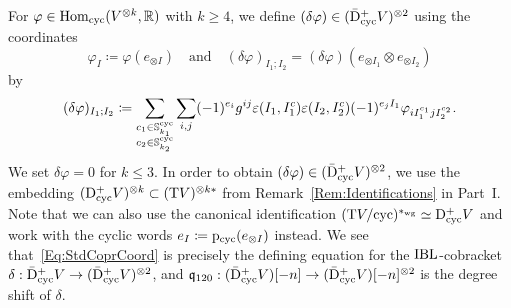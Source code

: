 \documentclass[\MainFolder/Text.tex]{subfiles}
\begin{document}
For $\varphi\in \mathrm{Hom}_{\mathrm{cyc}}(V^{\otimes k},\mathbb{R})$ with $k\ge 4$, we define $(\delta\varphi)\in(\bar{\mathrm{D}}^+_{\mathrm{cyc}} V)^{\otimes 2}$ using the coordinates
\begin{equation}\label{Eq:CoefCoord}
\varphi_{I} \coloneqq \varphi(e_{\otimes I})\quad\text{and}\quad (\delta\varphi)_{I_1;I_2} = (\delta\varphi)(e_{\otimes I_1} \otimes e_{\otimes I_2})
\end{equation}
by
\begin{equation}\label{Eq:StdCoprCoord}
(\delta\varphi)_{I_1;I_2} \coloneqq \sum_{\substack{c_1 \in\mathbb{S}^{\mathrm{cyc}}_{k_1} \\ c_2\in\mathbb{S}^{\mathrm{cyc}}_{k_2}}} \sum_{i,j} (-1)^{e_i}g^{ij} \varepsilon(I_1,I_1^c)\varepsilon(I_2,I_2^c)(-1)^{e_j I_1} \varphi_{i I_1^{c_1} j I_2^{c_2}}.
\end{equation}
We set $\delta \varphi = 0$ for $k\le 3$. In order to obtain $(\delta\varphi)\in(\bar{\mathrm{D}}^+_{\mathrm{cyc}} V)^{\otimes 2}$, we use the embedding $(\mathrm{D}^+_{\mathrm{cyc}} V)^{\otimes k} \subset (\mathrm{T} V)^{\otimes k*}$ from Remark~\ref{Rem:Identifications} in Part~I. Note that we can also use the canonical identification $(\mathrm{T} V/\mathrm{cyc})^{*_{\mathrm{wg}}}\simeq \mathrm{D}^+_{\mathrm{cyc}} V$ and work with the cyclic words $e_I \coloneqq \mathrm{p}_{\mathrm{cyc}}(e_{\otimes I})$ instead. We see that~\eqref{Eq:StdCoprCoord} is precisely the defining equation \cite[Equation~(10.6)]{Cieliebak2015} for the $\mathrm{IBL}$-cobracket $\delta: \bar{\mathrm{D}}^+_{\mathrm{cyc}} V \rightarrow (\bar{\mathrm{D}}^+_{\mathrm{cyc}} V)^{\otimes 2}$, and $\mathfrak{q}_{120}:(\bar{\mathrm{D}}^+_{\mathrm{cyc}} V)[-n]\rightarrow(\bar{\mathrm{D}}^+_{\mathrm{cyc}} V)[-n]^{\otimes 2}$ is the degree shift of $\delta$.
\end{document}
